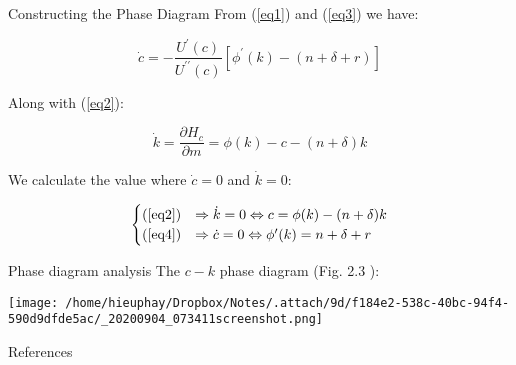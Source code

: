 \documentclass[10pt]{beamer}
\begin{document}
\begin{frame}[label={sec:orgc90649a}]{Constructing the Phase Diagram}
From (\ref{eq1}) and (\ref{eq3}) we have:

\begin{equation} \label{eq4}
  \dot{c} = - \frac{U^{\prime}(c)}{U^{\prime\prime}(c)}\left[\phi^{\prime}(k) - (n + \delta + r)\right]
\end{equation}

Along with (\ref{eq2}):

$$
\dot{k} = \frac{\partial H_{c}}{\partial m} = \phi(k) - c - (n + \delta)k
$$

We calculate the value where \(\dot{c} = 0\) and \(\dot{k} = 0\):

\begin{align}
  \begin{cases}
    (\ref{eq2}) &\Rightarrow \dot{k}=0 \Leftrightarrow c = \phi(k) - (n + \delta)k \\
    (\ref{eq4}) &\Rightarrow \dot{c}=0 \Leftrightarrow \phi^{\prime}(k) = n + \delta + r
  \end{cases}
\end{align}
\end{frame}

\begin{frame}[label={sec:org24e138e}]{Phase diagram analysis}
The \(c-k\) phase diagram (Fig. 2.3 \cite{romer19_advan}):

\begin{center}
\texttt{[image: /home/hieuphay/Dropbox/Notes/.attach/9d/f184e2-538c-40bc-94f4-590d9dfde5ac/\_20200904\_073411screenshot.png]}
\end{center}
\end{frame}


\begin{frame}[allowframebreaks]{References}
\printbibliography
\end{frame}
\end{document}
